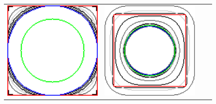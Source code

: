 \begin{figure}
\begin{tabular}{cccc}
\includegraphics[scale=0.15]{figures/chapter9/free-elastica/balanceflow/square/len_pen-0.01/radius-7/summary.pdf} &
\includegraphics[scale=0.15]{figures/chapter9/free-elastica/graphflow/square/len_pen-0.01/radius-7/summary.pdf} \\[1em]

\end{tabular}
\end{figure}
